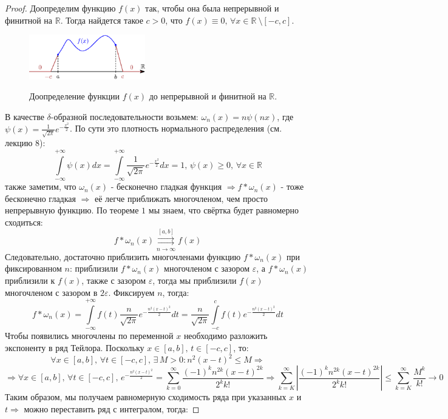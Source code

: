 \documentclass[12pt]{article}
\newcommand{\MR}{\mathbb{R}}
\newcommand{\VE}{\varepsilon}
\theoremstyle{definition}
\newcommand{\ddsum}[2]{\displaystyle\sum\limits_{#1}^{#2}}
\newcommand{\ddint}[2]{\displaystyle\int\limits_{#1}^{#2}}
\newcommand{\uconvm}[2]{\overset{#1}{\underset{#2}{\rightrightarrows}}}
\begin{document}
\begin{proof}
	Доопределим функцию $f(x)$ так, чтобы она была непрерывной и финитной на $\MR$. Тогда найдется такое $c > 0$, что $f(x) \equiv 0, \, \forall x \in \MR\ \setminus [-c,c]$.
	\begin{figure}[H]
		\centering
		\includegraphics[width=0.45\textwidth]{MA3L26_1.eps}
		\label{MA3L26_1}
		\caption{Доопределение функции $f(x)$ до непрерывной и финитной на $\MR$.}
		\label{fig: Доопределение функции}
	\end{figure}
	В качестве $\delta$-образной последовательности возьмем: $\omega_n(x) = n\psi(nx)$, где $\psi(x) = \tfrac{1}{\sqrt{2\pi}}e^{-\tfrac{x^2}{2}}$. По сути это плотность нормального распределения (см. лекцию $8$):
	$$
		\ddint{-\infty}{+\infty}\psi(x)dx = \ddint{-\infty}{+\infty}\dfrac{1}{\sqrt{2\pi}}e^{-\tfrac{x^2}{2}} dx = 1, \, \psi(x) \geq 0, \, \forall x \in \MR
	$$
	также заметим, что $\omega_n(x)$ - бесконечно гладкая функция $\Rightarrow f*\omega_n(x)$ - тоже бесконечно гладкая $\Rightarrow$ её легче приближать многочленом, чем просто непрерывную функцию. По теореме $1$ мы знаем, что свёртка будет равномерно сходиться: 
	$$
		f*\omega_n(x) \uconvm{[a,b]}{n \to \infty}f(x)
	$$ 
	Следовательно, достаточно приблизить многочленами функцию $f * \omega_n(x)$ при фиксированном $n$: приблизили $f*\omega_n(x)$ многочленом с зазором $\VE$, а $f*\omega_n(x)$ приблизили к $f(x)$, также с зазором $\VE$, тогда мы приблизили $f(x)$ многочленом с зазором в $2\VE$. Фиксируем $n$, тогда:
	$$
		f*\omega_n(x) = \ddint{-\infty}{+\infty}f(t)\dfrac{n}{\sqrt{2 \pi}}e^{-\tfrac{n^2(x-t)^2}{2}}dt = \dfrac{n}{\sqrt{2 \pi}}\ddint{-c}{c}f(t)e^{-\tfrac{n^2(x-t)^2}{2}}dt
	$$
	Чтобы появились многочлены по переменной $x$ необходимо разложить экспоненту в ряд Тейлора. Поскольку $x \in [a,b], \, t \in [-c,c]$, то:
	$$
		\forall x \in [a,b], \, \forall  t \in [-c,c], \, \exists \, M > 0\colon n^2(x - t)^2 \leq M \Rightarrow
	$$
	$$
		\Rightarrow \forall x \in [a,b], \, \forall  t \in [-c,c], \, e^{-\tfrac{n^2(x-t)^2}{2}} = \ddsum{k = 0}{\infty}\dfrac{(-1)^k n^{2k}(x-t)^{2k}}{2^k k!} \Rightarrow \ddsum{k = K}{\infty} \left|\dfrac{(-1)^k n^{2k}(x-t)^{2k}}{2^k k!}\right| \leq \ddsum{k = K}{\infty}\dfrac{M^k}{k!} \to 0
	$$
	Таким образом, мы получаем равномерную сходимость ряда при указанных $x$ и $t \Rightarrow$ можно переставить ряд с интегралом, тогда: 

\end{proof}
\end{document}
